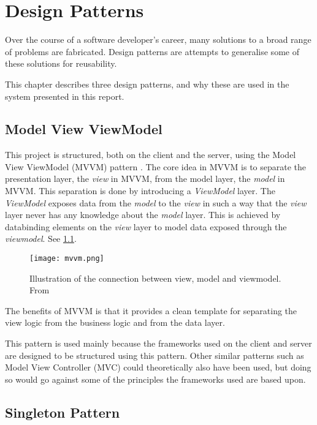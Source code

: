 \chapter{Design Patterns}

Over the course of a software developer's career, many solutions to a broad range of
problems are fabricated. Design patterns are attempts to generalise some of these solutions
for reusability.

This chapter describes three design patterns, and why these are used
in the system presented in this report.

\section{Model View ViewModel}

This project is structured, both on the client and the server, using
the Model View ViewModel (MVVM) pattern \cite{mvvm}. The core idea in MVVM is to
separate the presentation layer, the \textit{view} in MVVM, from the model
layer, the \textit{model} in MVVM. This separation is done by introducing a
\textit{ViewModel} layer. The \textit{ViewModel} exposes data from the \textit{model} to the \textit{view}
in such a way that the \textit{view} layer never has any knowledge about the
\textit{model} layer. This is achieved by databinding elements on the \textit{view}
layer to model data exposed through the \textit{viewmodel}. See \cref{fig:mvvm}.

\begin{figure}[hbtp]
  \centering
  \texttt{[image: mvvm.png]}
  \caption{Illustration of the connection between view, model and
    viewmodel. From \cite{mvvm}}\label{fig:mvvm}
\end{figure}

The benefits of MVVM is that it provides a clean template for
separating the view logic from the business logic and from the data
layer.

This pattern is used mainly because the frameworks used on the client
and server are designed to be structured using this pattern. Other
similar patterns such as Model View Controller (MVC) could
theoretically also have been used, but doing so would go against some
of the principles the frameworks used are based upon.

\section{Singleton Pattern}

